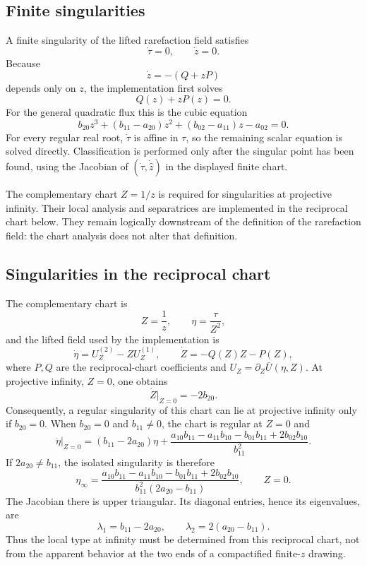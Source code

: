 \subsection{Finite singularities}

A finite singularity of the lifted rarefaction field satisfies
\[
\boxed{\dot\tau=0,\qquad \dot z=0.}
\]
Because
\[
\dot z=-(Q+zP)
\]
depends only on $z$, the implementation first solves
\[
Q(z)+zP(z)=0.
\]
For the general quadratic flux this is the cubic equation
\[
\boxed{
b_{20}z^3+(b_{11}-a_{20})z^2+(b_{02}-a_{11})z-a_{02}=0.
}
\]
For every regular real root, $\dot\tau$ is affine in $\tau$, so the remaining
scalar equation is solved directly.  Classification is performed only after
the singular point has been found, using the Jacobian of
$(\dot\tau,\dot{\hat z})$ in the displayed finite chart.

The complementary chart $Z=1/z$ is required for singularities at projective
infinity.  Their local analysis and separatrices are implemented in the reciprocal chart below. They remain logically downstream of the definition of the rarefaction field: the chart analysis does not alter that definition.

\subsection{Singularities in the reciprocal chart}

The complementary chart is
\[
Z=\frac1z,
\qquad
\eta=\frac{\tau}{Z^2},
\]
and the lifted field used by the implementation is
\[
\dot\eta=U_Z^{(2)}-Z U_Z^{(1)},
\qquad
\dot Z=-Q(Z)Z-P(Z),
\]
where $P,Q$ are the reciprocal-chart coefficients and
$U_Z=\partial_Z\bar U(\eta,Z)$.
At projective infinity, $Z=0$, one obtains
\[
\boxed{\dot Z\big|_{Z=0}=-2b_{20}.}
\]
Consequently, a regular singularity of this chart can lie at projective
infinity only if $b_{20}=0$.  When $b_{20}=0$ and $b_{11}\neq0$, the chart
is regular at $Z=0$ and
\[
\dot\eta\big|_{Z=0}
=
(b_{11}-2a_{20})\eta
+
\frac{a_{10}b_{11}-a_{11}b_{10}-b_{01}b_{11}+2b_{02}b_{10}}
     {b_{11}^2}.
\]
If $2a_{20}\neq b_{11}$, the isolated singularity is therefore
\[
\boxed{
\eta_\infty=
\frac{a_{10}b_{11}-a_{11}b_{10}-b_{01}b_{11}+2b_{02}b_{10}}
     {b_{11}^2(2a_{20}-b_{11})},
\qquad Z=0.
}
\]
The Jacobian there is upper triangular.  Its diagonal entries, hence its
eigenvalues, are
\[
\boxed{
\lambda_1=b_{11}-2a_{20},
\qquad
\lambda_2=2(a_{20}-b_{11}).
}
\]
Thus the local type at infinity must be determined from this reciprocal
chart, not from the apparent behavior at the two ends of a compactified
finite-$z$ drawing.


